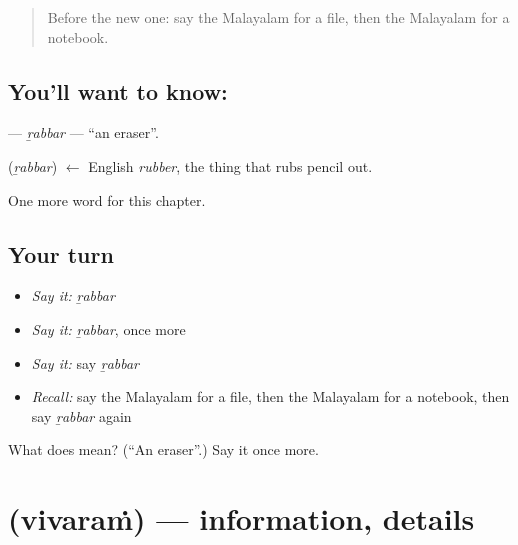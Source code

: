 \label{lesson:ML-C251-rabbar}



\begin{quote}
Before the new one: say the Malayalam for a file, then the Malayalam for a notebook.
\end{quote}

\subsection*{You'll want to know: }
\textbf{} — \emph{ṟabbar} — \textquotedblleft{}an eraser\textquotedblright{}.

\begin{cousinweb}
\textbf{} (\emph{ṟabbar}) $\leftarrow$ English \emph{rubber}, the thing that rubs pencil out.
\end{cousinweb}

\begin{grammarlens}[title={What you've built}]
One more word for this chapter.
\end{grammarlens}

\subsection*{Your turn}
\begin{itemize}
\raggedright
  \item \emph{Say it:} \emph{ṟabbar}
  \item \emph{Say it:} \emph{ṟabbar}, once more
  \item \emph{Say it:} say \emph{ṟabbar}
  \item \emph{Recall:} say the Malayalam for a file, then the Malayalam for a notebook, then say \emph{ṟabbar} again
\end{itemize}

\begin{tcolorbox}[breakable,colback=teal!4,colframe=teal!35!black,title={Before you move on}]
What does  mean? (\textquotedblleft{}An eraser\textquotedblright{}.) Say it once more.
\end{tcolorbox}
\section[\texorpdfstring{\ml{വിവരം} (vivaraṁ)}{വിവരം (vivaraṁ)}]{ (vivaraṁ) — information, details}

\label{lesson:ML-C251-vivaram}



